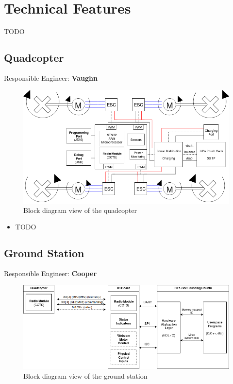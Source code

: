 \documentclass{article}
\begin{document}
\section{Technical Features}

TODO

\subsection{Quadcopter}

Responsible Engineer: \textbf{Vaughn}

\begin{figure}[h]
	\centering
	\includegraphics[width=\linewidth]{../src/im/quadcopter}
	\caption{Block diagram view of the quadcopter}
\end{figure}

\begin{itemize}
	\item TODO
\end{itemize}

\subsection{Ground Station}

Responsible Engineer: \textbf{Cooper}

\begin{figure}[h]
	\centering
	\includegraphics[width=\linewidth]{../src/im/ground_station}
	\caption{Block diagram view of the ground station}
\end{figure}
\end{document}
